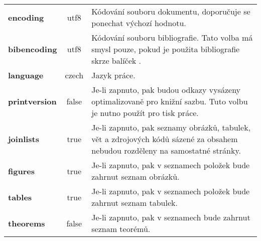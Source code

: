 \documentclass[
  biblatex,
  glossaries,
  index
]{kidiplom}
\begin{document}
\begin{table}
\begin{center}
{\begin{tabular}{>{\bfseries}l >{\ttfamily}c L{8cm}}
        encoding               & utf8                          & Kódování souboru dokumentu, doporučuje se ponechat výchozí hodnotu.                                                  \\

        bibencoding            & utf8                          & Kódování souboru bibliografie. Tato volba má smysl pouze, pokud je použita bibliografie skrze balíček \BibLaTeX{}.   \\

        language               & czech                         & Jazyk práce.                                                                                                         \\

        printversion           & false                         & Je-li zapnuto, pak budou odkazy vysázeny optimalizovaně pro knižní sazbu. Tuto volbu je nutno použít pro tisk práce. \\


        joinlists              & true                          & Je-li zapnuto, pak seznamy obrázků, tabulek, vět a
        zdrojových kódů sázené za obsahem nebudou rozděleny na samostatné stránky.                                                                                                    \\

        figures                & true                          & Je-li zapnuto, pak v seznamech položek bude zahrnut seznam obrázků.                                                  \\

        tables                 & true                          & Je-li zapnuto, pak v seznamech položek bude zahrnut seznam tabulek.                                                  \\

        theorems               & false                         & Je-li zapnuto, pak v seznamech bude zahrnut seznam teorémů.                                                          \\


\end{tabular}}
\end{center}
\end{table}
\end{document}
